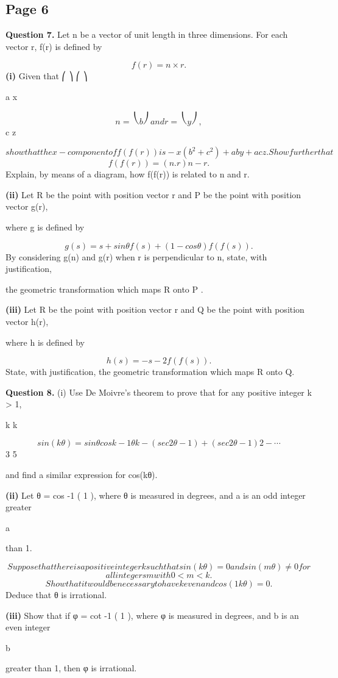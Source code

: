\documentclass[12pt]{article}
\begin{document}
\subsection*{Page 6}
\begin{flushleft}
\bigskip\textbf{Question 7.} Let n be a vector of unit length in three dimensions. For each vector r, f(r) is defined by\par
\[f(r) = n \times r .\]
\textbf{(i)} Given that ⎛ ⎞ ⎛ ⎞\par
a x\par
\[n = ⎝ b ⎠ and r = ⎝ y ⎠ ,\]
c z\par
\[show that the x-component of f(f(r)) is -x(b^2 + c^2 ) + aby + acz . Show further that\]
\[f(f(r)) = (n.r)n - r.\]
Explain, by means of a diagram, how f(f(r)) is related to n and r.\par
\textbf{(ii)} Let R be the point with position vector r and P be the point with position vector g(r),\par
where g is defined by\par
\[g(s) = s + sin θ f(s) + (1 - cos θ) f(f(s)) .\]
By considering g(n) and g(r) when r is perpendicular to n, state, with justification,\par
the geometric transformation which maps R onto P .\par
\textbf{(iii)} Let R be the point with position vector r and Q be the point with position vector h(r),\par
where h is defined by\par
\[h(s) = -s - 2 f(f(s)) .\]
State, with justification, the geometric transformation which maps R onto Q.\par
\bigskip\textbf{Question 8.} (i) Use De Moivre's theorem to prove that for any positive integer k > 1,\par
\alpha \alpha \beta \alpha \beta \beta\par
k k\par
\[sin(kθ) = sin θ cos k-1 θ k - (sec 2 θ - 1) + (sec 2 θ - 1) 2 - \cdots\]
3 5\par
and find a similar expression for cos(kθ).\par
\textbf{(ii)} Let θ = cos -1 ( 1 ), where θ is measured in degrees, and a is an odd integer greater\par
a\par
than 1.\par
\[Suppose that there is a positive integer k such that sin(kθ) = 0 and sin(mθ) \ne 0 for\]
\[all integers m with 0 < m < k.\]
\[Show that it would be necessary to have k even and cos( 1 kθ) = 0.\]
Deduce that θ is irrational.\par
\textbf{(iii)} Show that if φ = cot -1 ( 1 ), where φ is measured in degrees, and b is an even integer\par
b\par
greater than 1, then φ is irrational.\par
\end{flushleft}
\end{document}

